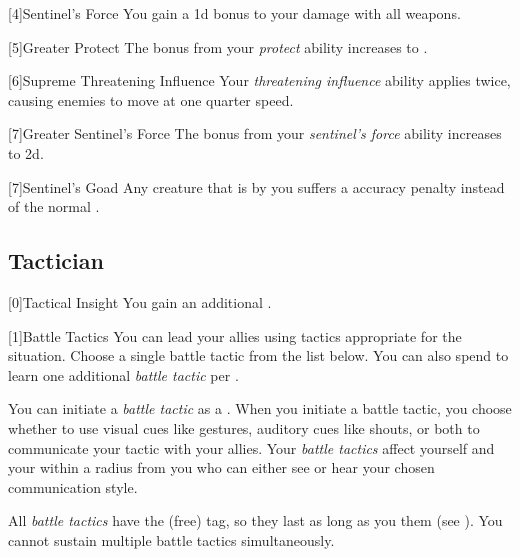         [4]{Sentinel's Force} You gain a \plus1d bonus to your damage with all weapons.

        [5]{Greater Protect} The bonus from your \textit{protect} ability increases to .

        [6]{Supreme Threatening Influence} Your \textit{threatening influence} ability applies  twice, causing enemies to move at one quarter speed.

        [7]{Greater Sentinel's Force} The bonus from your \textit{sentinel's force} ability increases to \plus2d.

        [7]{Sentinel's Goad} Any creature that is \goaded by you suffers a  accuracy penalty instead of the normal .

    \newpage
    \subsection{Tactician}

        [0]{Tactical Insight} You gain an additional .

        [1]{Battle Tactics}
        You can lead your allies using tactics appropriate for the situation.
        Choose a single battle tactic from the list below.
        You can also spend  to learn one additional \textit{battle tactic} per .

        You can initiate a \textit{battle tactic} as a .
        When you initiate a battle tactic, you choose whether to use visual cues like gestures, auditory cues like shouts, or both to communicate your tactic with your allies.
        Your \textit{battle tactics} affect yourself and your  within a \areahuge radius  from you who can either see or hear your chosen communication style.

        All \textit{battle tactics} have the  (free) tag, so they last as long as you  them (see ).
        You cannot sustain multiple battle tactics simultaneously.

